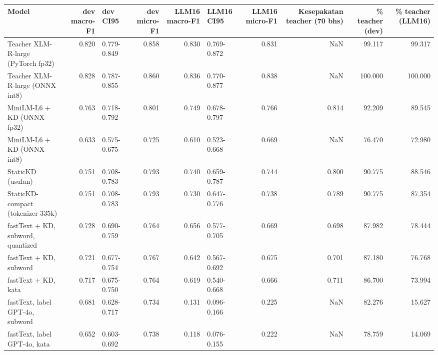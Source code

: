 \begin{tabular}{lrlrrlrrrr}
\toprule
Model & dev macro-F1 & dev CI95 & dev micro-F1 & LLM16 macro-F1 & LLM16 CI95 & LLM16 micro-F1 & Kesepakatan teacher (70 bhs) & \% teacher (dev) & \% teacher (LLM16) \\
\midrule
Teacher XLM-R-large (PyTorch fp32) & 0.820 & 0.779-0.849 & 0.858 & 0.830 & 0.769-0.872 & 0.831 & NaN & 99.117 & 99.317 \\
Teacher XLM-R-large (ONNX int8) & 0.828 & 0.787-0.855 & 0.860 & 0.836 & 0.770-0.877 & 0.838 & NaN & 100.000 & 100.000 \\
MiniLM-L6 + KD (ONNX fp32) & 0.763 & 0.718-0.792 & 0.801 & 0.749 & 0.678-0.797 & 0.766 & 0.814 & 92.209 & 89.545 \\
MiniLM-L6 + KD (ONNX int8) & 0.633 & 0.575-0.675 & 0.725 & 0.610 & 0.523-0.668 & 0.669 & NaN & 76.470 & 72.980 \\
StaticKD (usulan) & 0.751 & 0.708-0.783 & 0.793 & 0.740 & 0.659-0.787 & 0.744 & 0.800 & 90.775 & 88.546 \\
StaticKD-compact (tokenizer 335k) & 0.751 & 0.708-0.783 & 0.793 & 0.730 & 0.647-0.776 & 0.738 & 0.789 & 90.775 & 87.354 \\
fastText + KD, subword, quantized & 0.728 & 0.690-0.759 & 0.764 & 0.656 & 0.577-0.705 & 0.669 & 0.698 & 87.982 & 78.444 \\
fastText + KD, subword & 0.721 & 0.677-0.754 & 0.767 & 0.642 & 0.567-0.692 & 0.675 & 0.701 & 87.180 & 76.768 \\
fastText + KD, kata & 0.717 & 0.675-0.750 & 0.764 & 0.619 & 0.540-0.668 & 0.666 & 0.711 & 86.700 & 73.994 \\
fastText, label GPT-4o, subword & 0.681 & 0.628-0.717 & 0.734 & 0.131 & 0.096-0.166 & 0.225 & NaN & 82.276 & 15.627 \\
fastText, label GPT-4o, kata & 0.652 & 0.603-0.692 & 0.738 & 0.118 & 0.076-0.155 & 0.222 & NaN & 78.759 & 14.069 \\
\bottomrule
\end{tabular}
